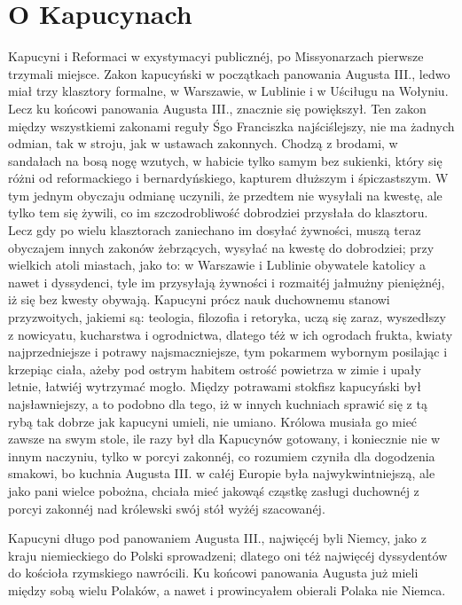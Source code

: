 \documentclass{book}
\begin{document}
\section{O Kapucynach}

Kapucyni i Reformaci w exystymacyi publicznéj, po Missyonarzach pierwsze trzymali miejsce. Zakon kapucyński w początkach panowania Augusta III., ledwo miał trzy klasztory formalne, w Warszawie, w Lublinie i w Uściługu na Wołyniu. Lecz ku końcowi panowania Augusta III., znacznie się powiększył. Ten zakon między wszystkiemi zakonami reguły Śgo Franciszka najściślejszy, nie ma żadnych odmian, tak w stroju, jak w ustawach zakonnych. Chodzą z brodami, w sandałach na bosą nogę wzutych, w habicie tylko samym bez sukienki, który się różni od reformackiego i bernardyńskiego, kapturem dłuższym i śpiczastszym. W tym jednym obyczaju odmianę uczynili, że przedtem nie wysyłali na kwestę, ale tylko tem się żywili, co im szczodrobliwość dobrodziei przysłała do klasztoru. Lecz gdy po wielu klasztorach zaniechano im dosyłać żywności, muszą teraz obyczajem innych zakonów żebrzących, wysyłać na kwestę do dobrodziei; przy wielkich atoli miastach, jako to: w Warszawie i Lublinie obywatele katolicy a nawet i dyssydenci, tyle im przysyłają żywności i rozmaitéj jałmużny pieniężnéj, iż się bez kwesty obywają. Kapucyni prócz nauk duchownemu stanowi przyzwoitych, jakiemi są: teologia, filozofia i retoryka, uczą się zaraz, wyszedłszy z nowicyatu, kucharstwa i ogrodnictwa, dlatego téż w ich ogrodach frukta, kwiaty najprzedniejsze i potrawy najsmaczniejsze, tym pokarmem wybornym posilając i krzepiąc ciała, ażeby pod ostrym habitem ostrość powietrza w zimie i upały letnie, łatwiéj wytrzymać mogło. Między potrawami stokfisz kapucyński był najsławniejszy, a to podobno dla tego, iż w innych kuchniach sprawić się z tą rybą tak dobrze jak kapucyni umieli, nie umiano. Królowa musiała go mieć zawsze na swym stole, ile razy był dla Kapucynów gotowany, i koniecznie nie w innym naczyniu, tylko w porcyi zakonnéj, co rozumiem czyniła dla dogodzenia smakowi, bo kuchnia Augusta III. w całéj Europie była najwykwintniejszą, ale jako pani wielce pobożna, chciała mieć jakowąś cząstkę zasługi duchownéj z porcyi zakonnéj nad królewski swój stół wyżéj szacowanéj.

Kapucyni długo pod panowaniem Augusta III., najwięcéj byli Niemcy, jako z kraju niemieckiego do Polski sprowadzeni; dlatego oni téż najwięcéj dyssydentów do kościoła rzymskiego nawrócili. Ku końcowi panowania Augusta już mieli między sobą wielu Polaków, a nawet i prowincyałem obierali Polaka nie Niemca.
\end{document}
